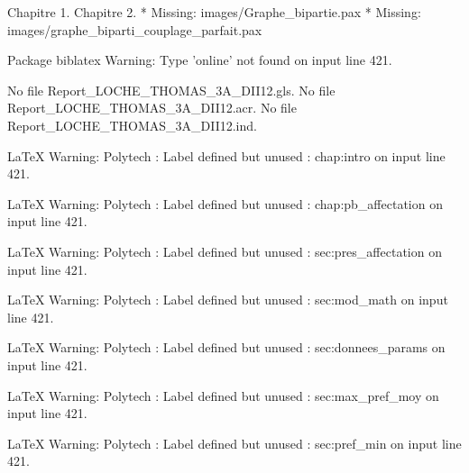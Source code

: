 Chapitre 1.
Chapitre 2.
* Missing: images/Graphe_bipartie.pax
* Missing: images/graphe_biparti_couplage_parfait.pax

Package biblatex Warning: Type 'online' not found on input line 421.

No file Report_LOCHE_THOMAS_3A_DII12.gls.
No file Report_LOCHE_THOMAS_3A_DII12.acr.
No file Report_LOCHE_THOMAS_3A_DII12.ind.

LaTeX Warning: Polytech : Label defined but unused : chap:intro on input line 421.


LaTeX Warning: Polytech : Label defined but unused : chap:pb_affectation on input line 421.


LaTeX Warning: Polytech : Label defined but unused : sec:pres_affectation on input line 421.


LaTeX Warning: Polytech : Label defined but unused : sec:mod_math on input line 421.


LaTeX Warning: Polytech : Label defined but unused : sec:donnees_params on input line 421.


LaTeX Warning: Polytech : Label defined but unused : sec:max_pref_moy on input line 421.


LaTeX Warning: Polytech : Label defined but unused : sec:pref_min on input line 421.





